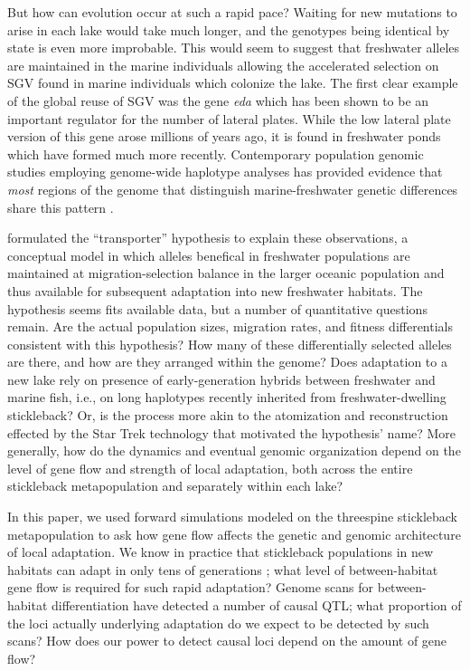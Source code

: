 \documentclass{article}
\begin{document}
But how can evolution occur at such a rapid pace? 
Waiting for new mutations to arise in each lake would take much longer, and the genotypes being identical by state is even more improbable. 
This would seem to suggest that freshwater alleles are maintained in the marine individuals allowing the accelerated selection on SGV found in marine individuals which colonize the lake. 
The first clear example of the global reuse of SGV was the gene \textit{eda} which has been shown to be an important regulator for the number of lateral plates. 
While the low lateral plate version of this gene arose millions of years ago, it is found in freshwater ponds which have formed much more recently. 
Contemporary population genomic studies employing genome-wide haplotype analyses has provided evidence that \textit{most} regions of the genome that distinguish marine-freshwater genetic differences share this pattern \citep{nelson2017ancient}. 
 
\citet{schluter2009genetics} formulated the ``transporter'' hypothesis to explain these observations,
a conceptual model in which alleles benefical in freshwater populations
are maintained at migration-selection balance in the larger oceanic population
and thus available for subsequent adaptation into new freshwater habitats.
The hypothesis seems fits available data,
but a number of quantitative questions remain.
Are the actual population sizes, migration rates, and fitness differentials
consistent with this hypothesis?
How many of these differentially selected alleles are there,
and how are they arranged within the genome?
Does adaptation to a new lake rely on presence of early-generation hybrids between freshwater and marine fish,
i.e., on long haplotypes recently inherited from freshwater-dwelling stickleback?
Or, is the process
more akin to the atomization and reconstruction effected by the Star Trek technology that motivated the hypothesis' name?
More generally, 
how do the dynamics and eventual genomic organization
depend on the level of gene flow and strength of local adaptation,
both across the entire stickleback metapopulation
and separately within each lake?

In this paper, we used forward simulations 
modeled on the threespine stickleback metapopulation
to ask how gene flow affects the genetic and genomic architecture of local adaptation.
We know in practice that stickleback populations in new habitats can adapt in only tens of generations \citep{middleton};
what level of between-habitat gene flow is required for such rapid adaptation?
Genome scans for between-habitat differentiation have detected a number of causal QTL;
what proportion of the loci actually underlying adaptation do we expect to be detected by such scans?
How does our power to detect causal loci depend on the amount of gene flow?
\end{document}
